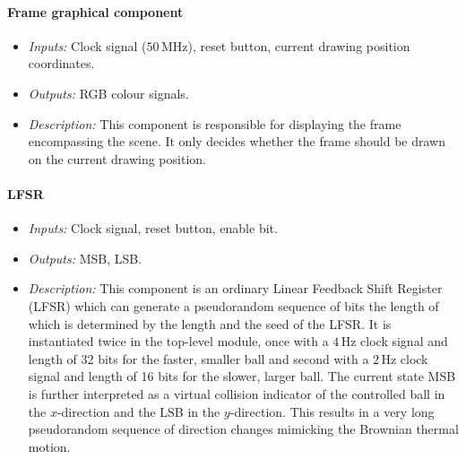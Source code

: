 \documentclass[11pt,a4paper]{article}
\def\MHz{\,\mathrm{MHz}}
\def\Hz{\,\mathrm{Hz}}
\begin{document}
        \paragraph{Frame graphical component}
        \begin{itemize}
            \item \emph{Inputs:} Clock signal ($50\MHz$), reset button, current drawing position coordinates.
            \item \emph{Outputs:} RGB colour signals.
            \item \emph{Description:} This component is responsible for displaying the frame encompassing the scene. It only decides whether the frame should be drawn on the current drawing position.
        \end{itemize}

        \paragraph{LFSR}
        \begin{itemize}
            \item \emph{Inputs:} Clock signal, reset button, enable bit.
            \item \emph{Outputs:} MSB, LSB.
            \item \emph{Description:} This component is an ordinary Linear Feedback Shift Register (LFSR) which can generate a pseudorandom sequence of bits the length of which is determined by the length and the seed of the LFSR. It is instantiated twice in the top-level module, once with a $4\Hz$ clock signal and length of 32 bits for the faster, smaller ball and second with a $2\Hz$ clock signal and length of 16 bits for the slower, larger ball. The current state MSB is further interpreted as a virtual collision indicator of the controlled ball in the $x$-direction and the LSB in the $y$-direction. This results in a very long pseudorandom sequence of direction changes mimicking the Brownian thermal motion.
        \end{itemize}
\end{document}

